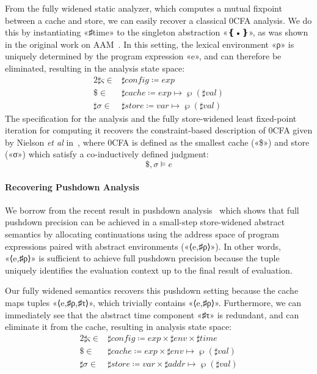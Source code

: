 From the fully widened static analyzer, which computes a mutual fixpoint
between a cache and store, we can easily recover a classical 0CFA analysis. We
do this by instantiating «♯{time}» to the singleton abstraction «❴•❵», as was
shown in the original work on AAM~\cite{dvanhorn:VanHorn2010Abstracting}. In
this setting, the lexical environment «ρ» is uniquely determined by the program
expression «e», and can therefore be eliminated, resulting in the analysis
state space:
\begin{alignat*}{2}
  ♯{ς} ∈ &\mathrel{} ♯{config} ≔ exp \\
    \$ ∈ &\mathrel{} ♯{cache} ≔ exp ↦ ℘(♯{val}) \\
  ♯{σ} ∈ &\mathrel{} ♯{store} ≔ var ↦ ℘(♯{val})
\end{alignat*}
The specification for the analysis and the fully store-widened least
fixed-point iteration for computing it recovers the constraint-based
description of 0CFA given by Nielson \emph{et al}
in~\cite{dvanhorn:Neilson:1999}, where 0CFA is defined as the smallest cache
(«\$») and store («σ») which satisfy a co-inductively defined judgment:
\[ \$,σ ⊨ e \]

\paragraph{Recovering Pushdown Analysis}

We borrow from the recent result in pushdown analysis~\cite{local:p4f} which shows
that full pushdown precision can be achieved in a small-step store-widened
abstract semantics by allocating continuations using the address space of
program expressions paired with abstract environments («⟨e,♯{ρ}⟩»). In other
words, «⟨e,♯{ρ}⟩» is sufficient to achieve full pushdown precision because
the tuple uniquely identifies the evaluation context up to the final result of
evaluation.

Our fully widened semantics recovers this pushdown setting because the
cache maps tuples «⟨e,♯{ρ},♯{τ}⟩», which trivially contains «⟨e,♯{ρ}⟩».
Furthermore, we can immediately see that the abstract time component «♯{τ}» is
redundant, and can eliminate it from the cache, resulting in analysis state
space:
\begin{alignat*}{2}
  ♯{ς} ∈ &\mathrel{} ♯{config} ≔ exp × ♯{env} × ♯{time} \\
    \$ ∈ &\mathrel{} ♯{cache} ≔ exp × ♯{env} ↦ ℘(♯{val}) \\
  ♯{σ} ∈ &\mathrel{} ♯{store} ≔ var × ♯{addr} ↦ ℘(♯{val})
\end{alignat*}

